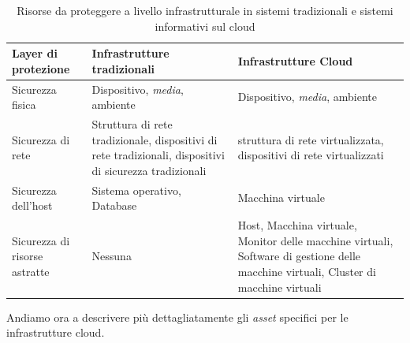 \documentclass[../main.tex]{subfiles}
\begin{document}
\begin{table}[h]
\centering
\begin{tabular}{| m{2cm}| m{5.6cm} | m{5.6cm} | }
\hline
\textbf{Layer di protezione} & \textbf{Infrastrutture tradizionali} & \textbf{Infrastrutture Cloud} \\ \hline

Sicurezza fisica & Dispositivo, \textit{media}, ambiente & Dispositivo, \textit{media}, ambiente \\ \hline

Sicurezza di rete & Struttura di rete tradizionale, dispositivi di rete tradizionali, dispositivi di sicurezza tradizionali & struttura di rete virtualizzata, dispositivi di rete virtualizzati \\ \hline

Sicurezza dell'host & Sistema operativo, Database & Macchina virtuale \\ \hline

Sicurezza di risorse astratte & Nessuna & Host, Macchina virtuale, Monitor delle macchine virtuali, Software di gestione delle macchine virtuali, Cluster di macchine virtuali \\  \hline

\end{tabular}
\caption{Risorse da proteggere a livello infrastrutturale in sistemi tradizionali e sistemi informativi sul cloud \cite{CSAssessmentSystemCG}}
\label{tab:cloud_security_assessment_tab_infr}
\end{table}

Andiamo ora a descrivere più dettagliatamente gli \textit{asset} specifici per le infrastrutture cloud.
\end{document}
